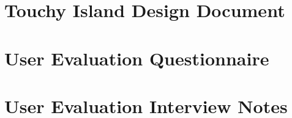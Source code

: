 \documentclass[12pt, a4paper]{report}
\begin{document}
\restoregeometry
\newpage


\begin{appendices}



\begingroup%
\makeatletter%
\cleardoublepage%
\let\newpage\relax%
\let\clearpage\relax%
\vspace*{\fill}%
\vspace*{\dimexpr-50\p@-\baselineskip}%
\chapter{Touchy Island Design Document}
\label{apx:touchyIslandDesignDocument}
\vspace*{\fill}%
\endgroup%


\begingroup%
\makeatletter%
\cleardoublepage%
\let\newpage\relax%
\let\clearpage\relax%
\vspace*{\fill}%
\vspace*{\dimexpr-50\p@-\baselineskip}%
\chapter{User Evaluation Questionnaire}
\label{apx:questionnaire}
\vspace*{\fill}%
\endgroup%


\begingroup%
\makeatletter%
\cleardoublepage%
\let\newpage\relax%
\let\clearpage\relax%
\vspace*{\fill}%
\vspace*{\dimexpr-50\p@-\baselineskip}%
\chapter{User Evaluation Interview Notes}
\label{apx:interviewNotes}
\vspace*{\fill}%
\endgroup%


\end{appendices}
\end{document}
